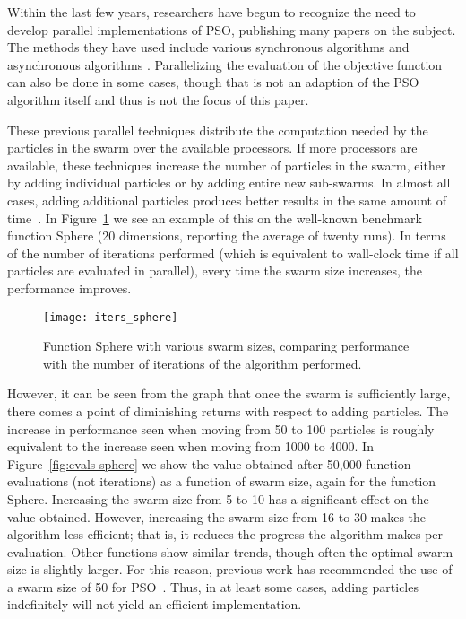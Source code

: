 \documentclass[smallcondensed]{svjour3}
\newcommand{\fig}[1]{Figure~\ref{fig:#1}}
\begin{document}
Within the last few years, researchers have begun to recognize the need to
develop parallel implementations of PSO, publishing many papers on the subject.
The methods they have used include various synchronous algorithms
\citep{parsopoulos-2004-parallel-vector-evaluated-pso} and asynchronous
algorithms \citep{mostaghim-2006-multi-objective-pso-on-grids}.  Parallelizing
the evaluation of the objective function can also be done in some cases, though
that is not an adaption of the PSO algorithm itself and thus is not the focus
of this paper.

These previous parallel techniques distribute the computation needed by the
particles in the swarm over the available processors.  If more processors are
available, these techniques increase the number of particles in the swarm,
either by adding individual particles or by adding entire new sub-swarms.  In
almost all cases, adding additional particles produces better results in the
same amount of time~\citep{mcnabb-2009-large-particle-swarms}.  In
\fig{iters-sphere} we see an example of this on the well-known benchmark
function Sphere (20 dimensions, reporting the average of twenty runs).  In
terms of the number of iterations performed (which is equivalent to wall-clock
time if all particles are evaluated in parallel), every time the swarm size
increases, the performance improves.

\begin{figure}
  \centering
  \texttt{[image: iters\_sphere]}
  \caption{Function Sphere with various swarm sizes, comparing performance with
  the number of iterations of the algorithm performed.}
  \label{fig:iters-sphere}
\end{figure}

However, it can be seen from the graph that once the swarm is sufficiently
large, there comes a point of diminishing returns with respect to adding
particles.  The increase in performance seen when moving from 50 to 100
particles is roughly equivalent to the increase seen when moving from 1000 to
4000.  In \fig{evals-sphere} we show the value obtained after 50,000 function
evaluations (not iterations) as a function of swarm size, again for the
function Sphere.  Increasing the swarm size from 5 to 10 has a significant
effect on the value obtained.  However, increasing the swarm size from 16 to 30
makes the algorithm less efficient; that is, it reduces the progress the
algorithm makes per evaluation.  Other functions show similar trends, though
often the optimal swarm size is slightly larger.  For this reason, previous
work has recommended the use of a swarm size of 50 for
PSO~\citep{bratton-2007-defining-a-standard-for-pso}.  Thus, in at least some
cases, adding particles indefinitely will not yield an efficient
implementation.
\end{document}

